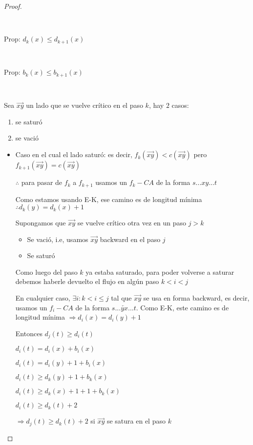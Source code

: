 \documentclass[11pt]{article}
\begin{document}
\begin{proof}
\begin{enumerate}
\end{enumerate}
\

Prop:  $d_k(x) \le d_{k+1}(x)$\par
\

Prop:  $b_k(x) \le b_{k+1}(x)$\par
\

Sea $\overrightarrow{xy}$ un lado que se vuelve crítico en el paso $k$, hay $2$ casos:\par
\begin{enumerate}
	\item  \begin{center}
			se saturó\par
		 \end{center}
	\item \begin{center}
			se vació\par
		\end{center}
\end{enumerate}
\begin{itemize}
\item Caso en el cual el lado saturó:  es decir, $f_k(\overrightarrow{xy}) < c(\overrightarrow{xy})$ pero  $f_{k+1}(\overrightarrow{xy}) = c(\overrightarrow{xy})$\par
$\therefore$ para pasar de $f_k$ a $f_{k+1}$ usamos un $f_k-CA$ de la forma $s...xy...t$\par
Como estamos usando E-K, ese camino es de longitud mínima $\therefore d_k(y) = d_k(x) + 1$\par
Supongamos que $\overrightarrow{xy}$ se vuelve crítico otra vez en un paso $j>k$\par
	\begin{itemize}
		\item Se vació, i.e, usamos $\overrightarrow{xy}$  backward en el paso $j$\par
		\item Se saturó\par
	\end{itemize}
Como luego del paso $k$ ya estaba saturado, para poder volverse a saturar debemos haberle devuelto el flujo en algún paso $k < i < j$\par
En cualquier caso, $\exists i: k < i \le j$ tal que $\overrightarrow{xy}$ se usa en forma backward, es decir, usamos un $f_i-CA$ de la forma $s...\overleftarrow{yx}...t$. Como E-K, este camino es de longitud mínima $\Rightarrow d_i(x) = d_i(y) + 1$\par
Entonces $d_j(t) \ge d_i(t)$
	\begin{center}
		$d_i(t) = d_i(x) + b_i(x)$\par
		$d_i(t) = d_i(y) + 1 + b_i(x)$\par
		$d_i(t) \ge d_k(y) + 1 + b_k(x)$\par
		$d_i(t) \ge d_k(x) + 1 + 1 + b_k(x)$\par
		$d_i(t) \ge d_k(t) + 2$\par
	\end{center}
$\Rightarrow d_j(t) \ge d_k(t) + 2$ si $\overrightarrow{xy}$ se satura en el paso $k$\par


\end{itemize}
\end{proof}
\end{document}
